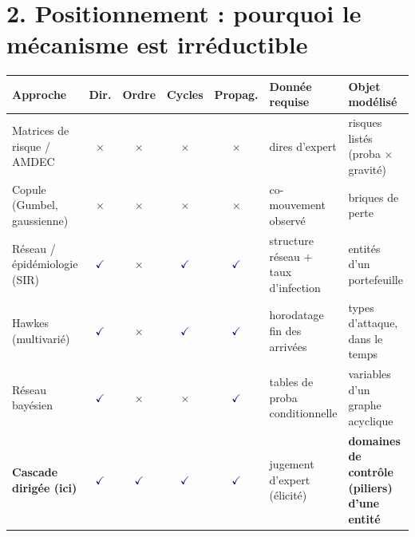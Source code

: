 \documentclass[11pt,a4paper]{article}
\newcommand{\oui}{\textcolor{navy}{$\checkmark$}}
\newcommand{\non}{\textcolor{accent}{$\times$}}
\newcommand{\cascell}{\cellcolor{softgreen}}
\begin{document}
\section*{2. Positionnement : pourquoi le mécanisme est irréductible}

\begin{center}\footnotesize
\renewcommand{\arraystretch}{1.35}
\begin{tabular}{@{}p{3.2cm} c c c c p{3.1cm} p{3.0cm}@{}}
\toprule
\textbf{Approche} & \textbf{Dir.} & \textbf{Ordre} & \textbf{Cycles} & \textbf{Propag.} &
\textbf{Donnée requise} & \textbf{Objet modélisé} \\
\midrule
Matrices de risque / AMDEC & \non & \non & \non & \non & dires d'expert & risques listés (proba $\times$ gravité) \\
Copule (Gumbel, gaussienne) & \non & \non & \non & \non & co-mouvement observé & briques de perte \\
Réseau / épidémiologie (SIR) & \oui & \non & \oui & \oui & structure réseau $+$ taux d'infection & entités d'un portefeuille \\
Hawkes (multivarié) & \oui & \non & \oui & \oui & horodatage fin des arrivées & types d'attaque, dans le temps \\
Réseau bayésien & \oui & \non & \non & \oui & tables de proba conditionnelle & variables d'un graphe acyclique \\
\cascell\textbf{Cascade dirigée (ici)} & \cascell\oui & \cascell\oui & \cascell\oui & \cascell\oui & \cascell jugement d'expert (élicité) & \cascell\textbf{domaines de contrôle (piliers) d'une entité} \\
\bottomrule
\end{tabular}
\end{center}
\end{document}
